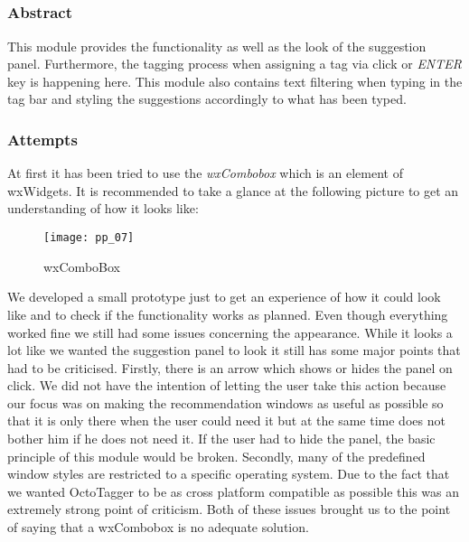 \subsection{}
\label{sub:mod:autocomplete}
\def\kapitelautor{Christoph Führer}

\subsubsection{Abstract}

This module provides the functionality as well as the look of the suggestion panel. Furthermore, the tagging process when assigning a tag via click or \textit{ENTER} key is happening here. This module also contains text filtering when typing in the tag bar and styling the suggestions accordingly to what has been typed.

\subsubsection{Attempts}

At first it has been tried to use the \textit{wxCombobox} which is an element of wxWidgets. It is recommended to take a glance at the following picture to get an understanding of how it looks like:

\begin{figure}[H]
    \centering
    \texttt{[image: pp\_07]}
    \caption{wxComboBox}
\end{figure}

We developed a small prototype just to get an experience of how it could look like and to check if the functionality works as planned. Even though everything worked fine we still had some issues concerning the appearance.
While it looks a lot like we wanted the suggestion panel to look it still has some major points that had to be criticised. Firstly, there is an arrow which shows or hides the panel on click. We did not have the intention of letting the user take this action because our focus was on making the recommendation windows as useful as possible so that it is only there when the user could need it but at the same time does not bother him if he does not need it. If the user had to hide the panel, the basic principle of this module would be broken. Secondly, many of the predefined window styles are restricted to a specific operating system. Due to the fact that we wanted OctoTagger to be as cross platform compatible as possible this was an extremely strong point of criticism. Both of these issues brought us to the point of saying that a wxCombobox is no adequate solution.

